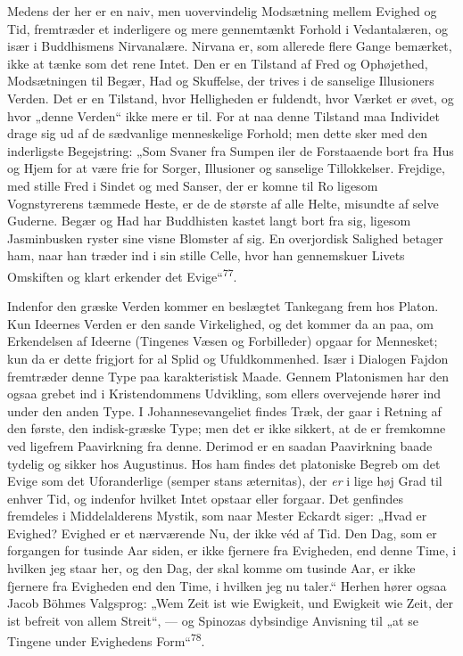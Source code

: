 \documentclass[12pt,a4paper,openany]{book}
\newcommand{\opage}[1]{\marginnote{\footnotesize\textit{[#1]}}}
\begin{document}
Medens der her er en naiv, men uovervindelig Modsætning mellem Evighed
og Tid, fremtræder et inderligere og mere gennemtænkt Forhold i
Vedantalæren, og især i Buddhismens Nirvanalære. Nirvana er, som
allerede flere Gange bemærket, ikke at tænke som det rene Intet. Den er
en Tilstand af Fred og Ophøjethed, Modsætningen til Begær, Had og
Skuffelse, der trives i de sanselige Illusioners Verden. Det er en
Tilstand, hvor Helligheden er fuldendt, hvor Værket er øvet, og hvor
„denne Verden“ ikke mere er til. For at naa denne Tilstand maa Individet
drage sig ud af de sædvanlige menneskelige Forhold; men dette sker med
den inderligste Begejstring: „Som Svaner fra Sumpen
\opage{156}iler de Forstaaende bort fra Hus og Hjem for at være frie for
Sorger, Illusioner og sanselige Tillokkelser. Frejdige, med stille Fred
i Sindet og med Sanser, der er komne til Ro ligesom Vognstyrerens
tæmmede Heste, er de de største af alle Helte, misundte af selve
Guderne. Begær og Had har Buddhisten kastet langt bort fra sig, ligesom
Jasminbusken ryster sine visne Blomster af sig. En overjordisk Salighed
betager ham, naar han træder ind i sin stille Celle, hvor han
gennemskuer Livets Omskiften og klart erkender det
Evige“\textsuperscript{77}.

Indenfor den græske Verden kommer en beslægtet Tankegang frem hos
Platon. Kun Ideernes Verden er den sande Virkelighed, og det kommer da
an paa, om Erkendelsen af Ideerne (Tingenes Væsen og Forbilleder) opgaar
for Mennesket; kun da er dette frigjort for al Splid og Ufuldkommenhed.
Især i Dialogen Fajdon fremtræder denne Type paa karakteristisk Maade.
Gennem Platonismen har den ogsaa grebet ind i Kristendommens Udvikling,
som ellers overvejende hører ind under den anden Type. I
Johannesevangeliet findes Træk, der gaar i Retning af den første, den
indisk-græske Type; men det er ikke sikkert, at de er fremkomne ved
ligefrem Paavirkning fra denne. Derimod er en saadan Paavirkning baade
tydelig og sikker hos Augustinus. Hos ham findes det platoniske Begreb
om det Evige som det Uforanderlige (semper stans æternitas), der
\textit{er} i lige høj Grad til enhver Tid, og indenfor hvilket Intet
opstaar eller forgaar. Det genfindes fremdeles i Middelalderens Mystik,
som naar Mester Eckardt siger: „Hvad er Evighed? Evighed er et
nærværende Nu, der ikke véd af Tid. Den Dag, som er forgangen for
tusinde Aar siden, er ikke fjernere fra Evigheden, end denne Time, i
hvilken jeg staar her, og den Dag, der skal komme om tusinde Aar, er
ikke fjernere fra Evigheden end den Time, i hvilken jeg nu taler.“
Herhen hører ogsaa Jacob Böhmes Valgsprog: „Wem Zeit ist wie Ewigkeit,
und Ewigkeit wie Zeit, der ist befreit von allem Streit“, --- og
Spinozas dybsindige Anvisning til „at se Tingene under Evighedens
Form“\textsuperscript{78}.
\end{document}

